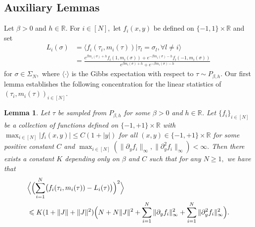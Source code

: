 \documentclass[letterpaper,11pt,reqno]{amsart}
\newtheorem{lem}[thm]{Lemma}
\renewcommand{\leq}{\leqslant}
\renewcommand{\geq}{\geqslant}
\newcommand{\ra}{\rangle}
\newcommand{\la}{\langle}
\newcommand{\mvgs}{{\sigma}}
\newcommand{\mvgt}{{\tau}}
\begin{document}
\subsection{Auxiliary
 Lemmas} 

 Let $\beta>0$ and $h\in \mathbb{R}$. For $i\in [N],$ let $f_i(x,y)$ be defined on $\{-1,1\}\times\mathbb{R}$ and set
\begin{align*}
    L_i(\mvgs)&=\la f_i(\tau_i,m_i(\tau))|\tau_l=\sigma_l,\forall l\neq i\ra\\
    &=\frac{e^{\beta m_i(\mvgs)+h}f_i(1,m_i(\mvgs))+e^{-\beta m_i(\mvgs)-h}f_i(-1,m_i(\mvgs))}{e^{\beta m_i(\mvgs)+h}+e^{-\beta m_i(\mvgs)-h}}
\end{align*}
for $\mvgs\in\Sigma_N,$
where $\la\cdot\ra$ is the Gibbs expectation with respect to $\tau\sim P_{\beta,h}.$
Our first lemma establishes the following concentration for the linear statistics of $(\tau_i,m_i(\tau))_{i\in [N]}$.



\begin{lem} \label{lem:new-concent}
Let $\mvgt$ be sampled from $P_{\beta, h}$ for some $\beta>0$ and $h\in \mathbb{R}$.
Let $\{f_i\}_{i\in [N]}$ be a collection of functions defined on $\{-1,+1\}\times \mathbb{R}$ with $\max_{i\in [N]}|f_i(x,y)|\leq C(1+|y|)$ for all $(x,y)\in \{-1,+1\}\times\mathbb{R}$ for some positive constant $C$ and $\max_{i\in [N]}(\|\partial_yf_i\|_\infty,\|\partial_{y}^2f_i\|_\infty)<\infty.$
Then there exists a constant $K$ depending only on $\beta$ and $C$ such that for any $N\geq 1,$ we have that 
    \begin{align*}
&\Bigl\la\Bigl(\sum_{i=1}^N\bigl(f_i(\tau_i,m_i(\mvgt))-L_i(\mvgt)\bigr)\Bigr)^2 \Bigr\ra\\
&\leq K(1+\|J\|+\|J\|^2)\Bigl(N+N\|J\|^2+\sum_{i=1}^N\|\partial_y f_i\|_\infty^2+\sum_{i=1}^N\|\partial_y^2f_i\|_\infty^2\Bigr).
\end{align*}
\end{lem}
\end{document}
